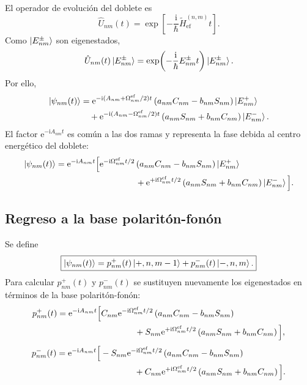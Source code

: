 \documentclass[11pt]{article}
\newcommand{\ii}{\mathrm{i}}
\newcommand{\ee}{\mathrm{e}}
\begin{document}
El operador de evoluci\'on del doblete es
\begin{equation}
  \hat U_{nm}(t)
  =
  \exp\!\left[
  -\frac{\ii}{\hbar}
  \tilde H_{\mathrm{ef}}^{(n,m)}t
  \right].
\end{equation}
Como $\ket{E_{nm}^{\pm}}$ son eigenestados,
\begin{equation}
  \hat U_{nm}(t)\ket{E_{nm}^{\pm}}
  =
  \exp\!\left(
  -\frac{\ii}{\hbar}E_{nm}^{\pm}t
  \right)
  \ket{E_{nm}^{\pm}}.
\end{equation}
Por ello,
\begin{align}
  \ket{\psi_{nm}(t)}
  &=
  \ee^{-\ii(A_{nm}+\Omega_{nm}^{\mathrm{ef}}/2)t}
  \left(a_{nm}C_{nm}-b_{nm}S_{nm}\right)
  \ket{E_{nm}^{+}}
  \notag\\
  &\quad+
  \ee^{-\ii(A_{nm}-\Omega_{nm}^{\mathrm{ef}}/2)t}
  \left(a_{nm}S_{nm}+b_{nm}C_{nm}\right)
  \ket{E_{nm}^{-}}.
\end{align}
El factor $\ee^{-\ii A_{nm}t}$ es com\'un a las dos ramas y representa la fase
debida al centro energ\'etico del doblete:
\begin{align}
  \ket{\psi_{nm}(t)}
  &=
  \ee^{-\ii A_{nm}t}
  \Big[
  \ee^{-\ii\Omega_{nm}^{\mathrm{ef}}t/2}
  \left(a_{nm}C_{nm}-b_{nm}S_{nm}\right)
  \ket{E_{nm}^{+}}
  \notag\\
  &\hspace{3.3cm}+
  \ee^{+\ii\Omega_{nm}^{\mathrm{ef}}t/2}
  \left(a_{nm}S_{nm}+b_{nm}C_{nm}\right)
  \ket{E_{nm}^{-}}
  \Big].
\end{align}

\subsection{Regreso a la base polarit\'on-fon\'on}

Se define
\begin{equation}
  \boxed{
  \ket{\psi_{nm}(t)}
  =
  p_{nm}^{+}(t)\ket{+,n,m-1}
  +
  p_{nm}^{-}(t)\ket{-,n,m}.
  }
\end{equation}
Para calcular $p_{nm}^{+}(t)$ y $p_{nm}^{-}(t)$ se sustituyen nuevamente los
eigenestados en t\'erminos de la base polarit\'on-fon\'on:
\begin{align}
  p_{nm}^{+}(t)
  &=
  \ee^{-\ii A_{nm}t}
  \Big[
  C_{nm}\ee^{-\ii\Omega_{nm}^{\mathrm{ef}}t/2}
  \left(a_{nm}C_{nm}-b_{nm}S_{nm}\right)
  \notag\\
  &\hspace{3.2cm}+
  S_{nm}\ee^{+\ii\Omega_{nm}^{\mathrm{ef}}t/2}
  \left(a_{nm}S_{nm}+b_{nm}C_{nm}\right)
  \Big],
\end{align}
\begin{align}
  p_{nm}^{-}(t)
  &=
  \ee^{-\ii A_{nm}t}
  \Big[
  -S_{nm}\ee^{-\ii\Omega_{nm}^{\mathrm{ef}}t/2}
  \left(a_{nm}C_{nm}-b_{nm}S_{nm}\right)
  \notag\\
  &\hspace{3.2cm}+
  C_{nm}\ee^{+\ii\Omega_{nm}^{\mathrm{ef}}t/2}
  \left(a_{nm}S_{nm}+b_{nm}C_{nm}\right)
  \Big].
\end{align}
\end{document}
